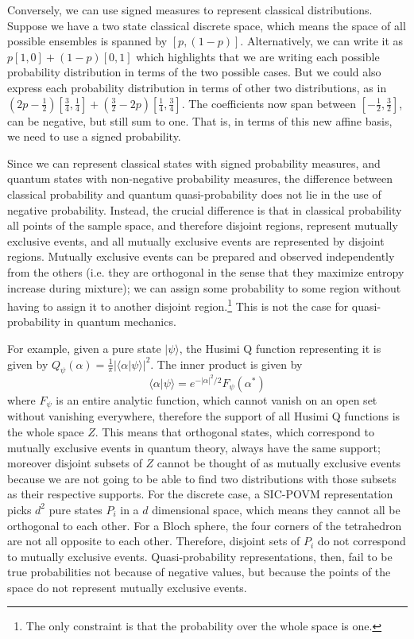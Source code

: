 \documentclass[10pt,twocolumn, nofootinbib]{revtex4-2}
\def\>{\rangle}
\begin{document}
Conversely, we can use signed measures to represent classical distributions. Suppose we have a two state classical discrete space, which means the space of all possible ensembles is spanned by $[p, (1-p)]$. Alternatively, we can write it as $p[1,0] + (1-p)[0,1]$ which highlights that we are writing each possible probability distribution in terms of the two possible cases. But we could also express each probability distribution in terms of other two distributions, as in $\left(2p - \frac{1}{2}\right)\left[\frac{3}{4}, \frac{1}{4}\right] + \left(\frac{3}{2} - 2p\right)\left[\frac{1}{4}, \frac{3}{4}\right]$. The coefficients now span between $\left[-\frac{1}{2}, \frac{3}{2}\right]$, can be negative, but still sum to one. That is, in terms of this new affine basis, we need to use a signed probability.

Since we can represent classical states with signed probability measures, and quantum states with non-negative probability measures, the difference between classical probability and quantum quasi-probability does not lie in the use of negative probability. Instead, the crucial difference is that in classical probability all points of the sample space, and therefore disjoint regions, represent mutually exclusive events, and all mutually exclusive events are represented by disjoint regions. Mutually exclusive events can be prepared and observed independently from the others (i.e. they are orthogonal in the sense that they maximize entropy increase during mixture); we can assign some probability to some region without having to assign it to another disjoint region.\footnote{The only constraint is that the probability over the whole space is one.} This is not the case for quasi-probability in quantum mechanics.

For example, given a pure state $|\psi\>$, the Husimi Q function representing it is given by $Q_\psi(\alpha) = \frac{1}{\pi} |\langle \alpha | \psi \rangle|^2$. The inner product is given by \cite[eq. 11.7-1]{mandel1995}
\begin{equation}
	\langle \alpha | \psi \rangle = e^{-|\alpha|^2/2} F_\psi(\alpha^\ast)
\end{equation}
where $F_\psi$ is an entire analytic function, which cannot vanish on an open set without vanishing everywhere, therefore the support of all Husimi Q functions is the whole space $Z$. This means that orthogonal states, which correspond to mutually exclusive events in quantum theory, always have the same support; moreover disjoint subsets of $Z$ cannot be thought of as mutually exclusive events because we are not going to be able to find two distributions with those subsets as their respective supports. For the discrete case, a SIC-POVM representation picks $d^2$ pure states $P_i$ in a $d$ dimensional space, which means they cannot all be orthogonal to each other. For a Bloch sphere, the four corners of the tetrahedron are not all opposite to each other. Therefore, disjoint sets of $P_i$ do not correspond to mutually exclusive events. Quasi-probability representations, then, fail to be true probabilities not because of negative values, but because the points of the space do not represent mutually exclusive events.
\end{document}
